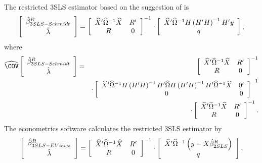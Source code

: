 The restricted 3SLS estimator based on the suggestion of
\cite{schmidt90} is
\begin{equation}
   \left[ \begin{array}{c}
      \hat{\beta}^R_{3SLS-Schmidt} \\[0.2em] \hat{\lambda}
   \end{array} \right]
   =
   \left[ \begin{array}{cc}
      \widehat{X}' \widehat{\Omega}^{-1} \widehat{X} & R' \\
      R & 0
   \end{array} \right]^{-1}
   \cdot
   \left[ \begin{array}{c}
      \widehat{X}' \widehat{\Omega}^{-1} H \left( H' H \right)^{-1} H' y \\ q
   \end{array} \right] ,
   \label{eq:3slsSchmidtR}
\end{equation}
where
\begin{eqnarray}
   \COVHat
   \left[ \begin{array}{c}
      \bHat^R_{3SLS-Schmidt} \\[0.2em] \lHat
   \end{array} \right] 
   & = & 
   \left[ \begin{array}{cc}
      \XHat' \OHat^{-1} \XHat & R' \\
      R & 0
   \end{array} \right]^{-1}
   \\
   & & \cdot
   \left[ \begin{array}{cc}
      \XHat' \OHat^{-1} H \left( H' H \right)^{-1} H' \OHat
      H \left( H' H \right)^{-1} H' \OHat^{-1} \XHat & 0' \\
      0 & 0
   \end{array} \right]^{-1}
   \nonumber \\
   & & \cdot
   \left[ \begin{array}{cc}
      \XHat' \OHat^{-1} \XHat & R' \\
      R & 0
   \end{array} \right]^{-1} .
   \nonumber
\end{eqnarray}
The econometrics software  calculates the restricted 3SLS estimator by
\begin{equation}
   \left[ \begin{array}{c}
      \hat{\beta}^R_{3SLS-EViews} \\[0.2em] \hat{\lambda}
   \end{array} \right]
   =
   \left[ \begin{array}{cc}
      \widehat{X}' \widehat{\Omega}^{-1} \widehat{X} & R' \\
      R & 0
   \end{array} \right]^{-1}
   \cdot
   \left[ \begin{array}{c}
      \widehat{X}' \widehat{\Omega}^{-1} \left( y - X \hat{\beta}^R_{2SLS} \right)
      \\ q 
   \end{array} \right] ,
   \label{eq:3slsEViewsR}
\end{equation}
